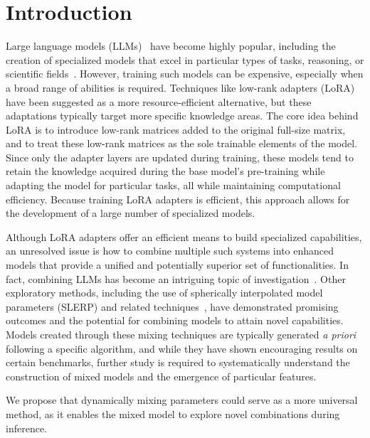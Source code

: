 \section{Introduction}
Large language models (LLMs)~\cite{Vaswani2017AttentionNeedc,Touvron2023LlamaModels,OpenAI2023GPT-4Report,Chowdhery2022PaLM:Pathways,Jiang2023Mistral7B,Gunasekar2023TextbooksNeed} have become highly popular, including the creation of specialized models that excel in particular types of tasks, reasoning, or scientific fields~\cite{Bubeck2023SparksGPT-4,Buehler2023MechGPTModalities,Nejjar2023LLMsAnalysis,Buehler2023GenerativeDesign,Luu2023BioinspiredLLM:Materials,Luu2023GenerativeSolvents,Buehler2023MeLMProblemsb,Ge2023OpenAGI:Experts}. However, training such models can be expensive, especially when a broad range of abilities is required. Techniques like low-rank adapters (LoRA)\cite{hu2021lora} have been suggested as a more resource-efficient alternative, but these adaptations typically target more specific knowledge areas. The core idea behind LoRA is to introduce low-rank matrices added to the original full-size matrix, and to treat these low-rank matrices as the sole trainable elements of the model. Since only the adapter layers are updated during training, these models tend to retain the knowledge acquired during the base model’s pre-training while adapting the model for particular tasks, all while maintaining computational efficiency. Because training LoRA adapters is efficient, this approach allows for the development of a large number of specialized models.

Although LoRA adapters offer an efficient means to build specialized capabilities, an unresolved issue is how to combine multiple such systems into enhanced models that provide a unified and potentially superior set of functionalities. In fact, combining LLMs has become an intriguing topic of investigation~\cite{Kim2023SOLARUp-Scaling}. Other exploratory methods, including the use of spherically interpolated model parameters (SLERP) and related techniques~\cite{Arcee-ai/mergekit:Models.}, have demonstrated promising outcomes and the potential for combining models to attain novel capabilities. Models created through these mixing techniques are typically generated {\it a priori} following a specific algorithm, and while they have shown encouraging results on certain benchmarks, further study is required to systematically understand the construction of mixed models and the emergence of particular features.

We propose that dynamically mixing parameters could serve as a more universal method, as it enables the mixed model to explore novel combinations during inference.

